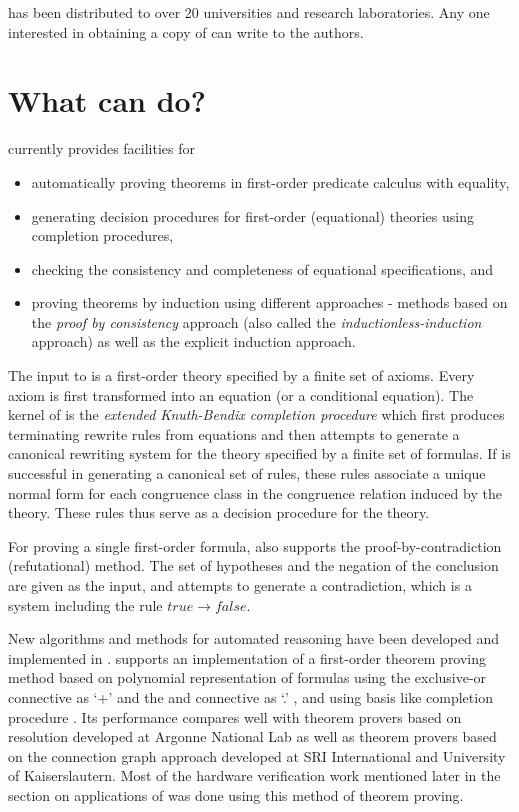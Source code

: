 \RRL has been distributed to over 20 universities and research
laboratories. Any one interested in obtaining a copy of \RRL can write
to the authors.

\section{What can \RRL do?}

\RRL currently
provides facilities for
\begin{itemize}
\item 
automatically proving theorems in first-order predicate calculus
with equality,
\item
generating decision procedures for first-order (equational)
theories using completion procedures,
\item 
checking the consistency and completeness of equational
specifications, and
\item 
proving theorems by 
induction using different approaches - methods
based on the {\em proof by consistency} approach \cite{Musser80,KapurMusser84}
(also called the {\em inductionless-induction} approach) as well as 
the explicit induction approach.
\end{itemize}

The input to \RRL is a first-order theory specified by a finite set of
axioms.  Every axiom is first transformed into an equation (or a
conditional equation).  The kernel of \RRL is the {\em extended
Knuth-Bendix completion procedure} \cite{KnuthBendix,LB77,PS81} which
first produces terminating rewrite rules from equations and then
attempts to generate a canonical rewriting system for the theory
specified by a finite set of formulas.  If \RRL is successful in
generating a canonical set of rules, these rules associate a unique
normal form for each congruence class in the congruence relation
induced by the theory.  These rules thus serve as a decision procedure
for the theory.  

For proving a single first-order formula, \RRL also supports the
proof-by-contradiction (refutational) method. The set of hypotheses
and the negation of the conclusion are given as the input, and \RRL
attempts to generate a contradiction, which is a system including the
rule $true \rightarrow false$.

New algorithms and methods for automated reasoning have been developed
and implemented in \ERRL. 
\RRL supports an implementation of a first-order theorem proving method
based on polynomial representation of formulas using the exclusive-or
connective as `+' and the and connective as `.' \cite{Hsiang85}, and
using \Groebner basis like completion procedure \cite{KN85}.  Its
performance compares well with theorem provers based on resolution
developed at Argonne National Lab as well as theorem provers based on
the connection graph approach developed at SRI International and University of
Kaiserslautern. Most of the hardware verification work mentioned later
in the section on applications of \RRL was done using this method of
theorem proving.
 
